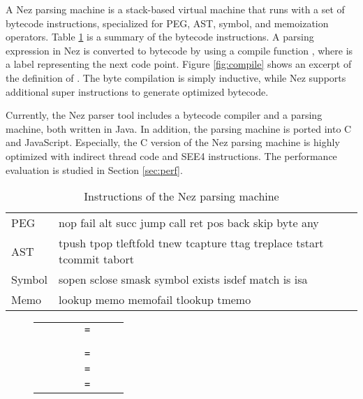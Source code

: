 \documentclass[preprint]{sigplanconf}
\begin{document}
{{{A Nez parsing machine is a stack-based virtual machine that runs with a set of bytecode instructions, specialized for PEG, AST, symbol, and memoization operators. Table \ref{table:insts} is a summary of the bytecode instructions. A parsing expression  in Nez is converted to bytecode by using a compile function , where  is a label representing the next code point. Figure \ref{fig:compile} shows an excerpt of the definition of . The byte compilation is simply inductive, while Nez supports additional super instructions to generate optimized bytecode.  

Currently, the Nez parser tool includes a bytecode compiler and a parsing machine, both written in Java. In addition, the parsing machine is ported into C and JavaScript. Especially, the C version of the Nez parsing machine is highly optimized with indirect thread code and SEE4 instructions. The performance evaluation is studied in Section \ref{sec:perf}.

\begin{table}[tb]
\begin{tabular}{lp{6cm}}
PEG &
\textsf{
\noindent
nop fail alt succ jump call ret pos back skip byte any 
} \\
AST &
\textsf{
\noindent
tpush tpop tleftfold tnew tcapture ttag treplace 
tstart tcommit tabort 
} \\
Symbol &
\textsf{
\noindent
sopen sclose smask symbol exists isdef match is isa 
} \\
Memo &
\textsf{
\noindent
lookup memo memofail tlookup tmemo
} \\

\end{tabular}

\caption{Instructions of the Nez parsing machine}
\label{table:insts}

\end{table}

\begin{figure}[tb]

\begin{small}
\begin{center}

\begin{tabular}{lrrl}
      &  \verb|      = | &  &   \\
&  &  &   \\
&  &  &   \\
      &  \verb|      = | & &   \\
      &  \verb|      = | & &   \\
      &  \verb|      = | & &   \\


\end{tabular}
\end{center}
\end{small}
\end{figure}}}}
\end{document}
